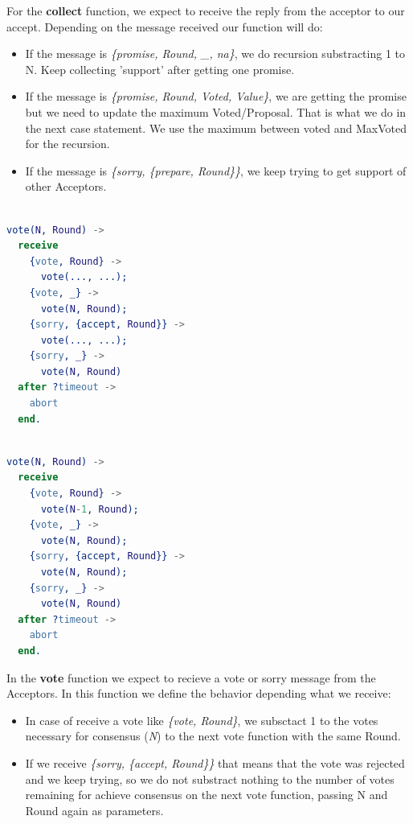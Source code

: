 \documentclass[a4paper, 10pt]{article}
\begin{document}
For the \textbf{collect} function, we expect to receive the reply from the acceptor to our accept. Depending on the message received our function will do:

\begin{itemize}
  \item If the message is \textit{\{promise, Round, \_, na\}}, we do recursion substracting 1 to N. Keep collecting 'support' after getting one promise.
  \item If the message is \textit{\{promise, Round, Voted, Value\}}, we are getting the promise but we need to update the maximum Voted/Proposal. That is what we do in the next case statement. We use the maximum between voted and MaxVoted for the recursion.
  \item If the message is \textit{\{sorry, \{prepare, Round\}\}}, we keep trying to get support of other Acceptors.
\end{itemize}



    \begin{minipage}{.45\textwidth}
	\begin{lstlisting}[language=erlang, caption={Template}]
	
vote(N, Round) ->
  receive
    {vote, Round} ->
      vote(..., ...);
    {vote, _} ->
      vote(N, Round);
    {sorry, {accept, Round}} ->
      vote(..., ...);
    {sorry, _} ->
      vote(N, Round)
  after ?timeout ->
    abort
  end.
  \end{lstlisting}
    \end{minipage}\hfill
    \begin{minipage}{.45\textwidth}
	\begin{lstlisting}[language=erlang, caption={Filled version}]
	
vote(N, Round) ->
  receive
    {vote, Round} ->
      vote(N-1, Round);
    {vote, _} ->
      vote(N, Round);
    {sorry, {accept, Round}} ->
      vote(N, Round);
    {sorry, _} ->
      vote(N, Round)
  after ?timeout ->
    abort
  end.
	\end{lstlisting}
    \end{minipage}

  In the \textbf{vote} function we expect to recieve a vote or sorry message from the Acceptors. In this function we define the behavior depending what we receive: 
  
  \begin{itemize}
    \item In case of receive a vote like \textit{\{vote, Round\}}, we subsctact 1 to the votes necessary for consensus (\textit{N}) to the next vote function with the same Round. 

    \item If we receive \textit{\{sorry, \{accept, Round\}\}} that means that the vote was rejected and we keep trying, so we do not substract nothing to the number of votes remaining for achieve consensus on the next vote function, passing N and Round again as parameters.
  \end{itemize}
    
\end{document}
